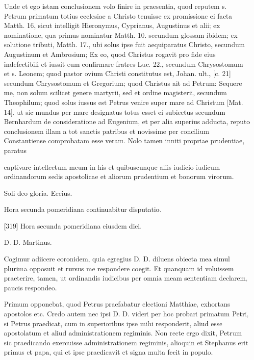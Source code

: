 Unde et ego istam conclusionem volo finire in praesentia, quod reputem s. Petrum primatum totius ecclesiae a Christo tenuisse ex promissione ei facta Matth. 16, sicut intelligit Hieronymus, Cyprianus, Augustinus et alii; ex nominatione, qua primus nominatur Matth. 10. secundum glossam ibidem; ex solutione tributi, Matth. 17., ubi solus ipse fuit aequiparatus Christo, secundum Augustinum et Ambrosium; Ex eo, quod Christus rogavit pro fide eius indefectibili et iussit eum confirmare fratres Luc. 22., secundum Chrysostomum et s. Leonem; quod pastor ovium Christi constitutus est, Johan. ult., [c. 21] secundum Chrysostomum et Gregorium; quod Christus ait ad Petrum: Sequere me, non solum scilicet genere martyrii, sed et ordine magisterii, secundum Theophilum; quod solus iussus est Petrus venire super mare ad Christum [Mat. 14], ut sic mundus per mare designatus totus esset ei subiectus secundum Bernhardum de consideratione ad Eugenium, et per alia superius adducta, reputo conclusionem illam a tot sanctis patribus et novissime per concilium Constantiense comprobatam esse veram. Nolo tamen inniti propriae prudentiae, paratus

captivare intellectum meum in his et quibuscunque aliis iudicio iudicum ordinandorum sedis apostolicae et aliorum prudentium et bonorum virorum.

Soli deo gloria. Eccius.

Hora secunda pomeridiana continuabitur disputatio.

[319] Hora secunda pomeridiana eiusdem diei.

D. D. Martinus.

Cogimur adiicere coronidem, quia egregius D. D. diluens obiecta mea simul plurima opposuit et rursus me respondere coegit. Et quanquam id voluissem praeterire, tamen, ut ordinandis iudicibus per omnia meam sententiam declarem, paucis respondeo.

Primum opponebat, quod Petrus praefabatur electioni Matthiae, exhortans apostolos etc. Credo autem nec ipsi D. D. videri per hoc probari primatum Petri, si Petrus praedicat, cum in superioribus ipse mihi responderit, aliud esse apostolatum et aliud administrationem regiminis. Non recte ergo dixit, Petrum sic praedicando exercuisse administrationem regiminis, alioquin et Stephanus erit primus et papa, qui et ipse praedicavit et signa multa fecit in populo.

